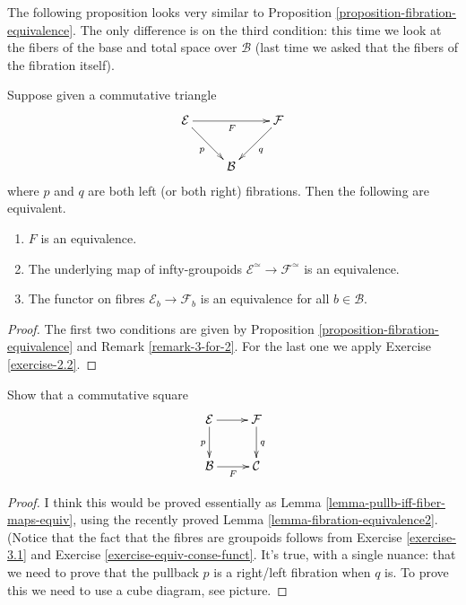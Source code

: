 \noindent
The following proposition looks very similar
to
Proposition
\ref{proposition-fibration-equivalence}.
The only difference is on the third
condition:
this time we look at the fibers of the base
and total space over $\mathcal{B}$
(last time we asked that the fibers
of the fibration itself).

\begin{lemma}
\label{lemma-fibration-equivalence2}
Suppose given a commutative triangle
$$
\xymatrix{
\mathcal{E} \ar[rd]_{p} \ar[rr]_{F} &&
\mathcal{F} \ar[dl]^{q} \\
& \mathcal{B}
}
$$
where $p$ and $q$ are both left (or both
right) fibrations.
Then the following are equivalent.
\begin{enumerate}
\item $F$ is an equivalence.
\item The underlying map of
infty-groupoids
$\mathcal{E}^\simeq\to\mathcal{F}^\simeq$ is
an equivalence.
\item The functor on fibres
$\mathcal{E}_b\to\mathcal{F}_b$
is an equivalence for all $b \in
\mathcal{B}$.
\end{enumerate}
\end{lemma}

\begin{proof}
The first two conditions are given by
Proposition
\ref{proposition-fibration-equivalence}
and Remark \ref{remark-3-for-2}.
For the last one we apply Exercise
\ref{exercise-2.2}.
\end{proof}

\begin{exercise}
\label{exercise-pullb-iff-fiber-maps-equiv}
Show that a commutative square
$$
\xymatrix{
\mathcal{E}\ar[r]\ar[d]_{p}&\mathcal{F}\ar[d]
^{q}\\
\mathcal{B}\ar[r]_{F}&\mathcal{C}
}
$$
\end{exercise}

\begin{proof}
I think this would be proved
essentially as Lemma
\ref{lemma-pullb-iff-fiber-maps-equiv},
using the recently proved Lemma
\ref{lemma-fibration-equivalence2}.
(Notice that the fact that the fibres are
groupoids
follows from Exercise \ref{exercise-3.1} and
Exercise
\ref{exercise-equiv-conse-funct}.
It's true, with a single nuance: that we need
to prove that the pullback $p$
is a right/left fibration when $q$ is.
To prove this we need to use a cube diagram,
see picture.
\end{proof}



